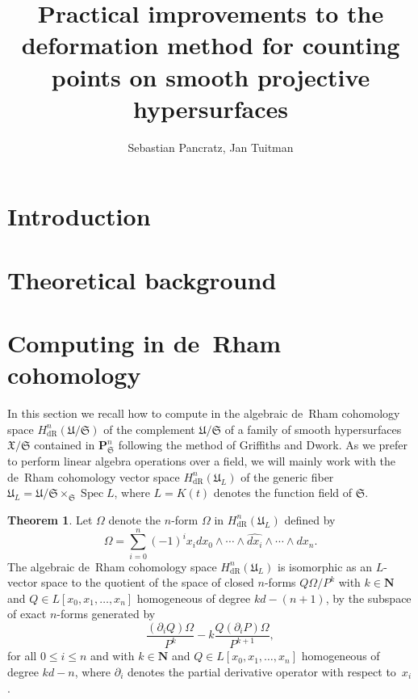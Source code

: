 \documentclass[a4paper,11pt]{article}
\author{Sebastian Pancratz, Jan Tuitman}
\title{Practical improvements to the deformation method for counting points on smooth projective hypersurfaces}
\numberwithin{equation}{section}
\newcommand{\NN}{\mathbf{N}} %
\DeclareMathOperator{\Spec}{Spec}        %
\providecommand{\HdR}{H_{\text{dR}}}    %
\theoremstyle{definition}
\newtheorem{thm}{Theorem}[section]
\begin{document}
\maketitle

\tableofcontents


\section{Introduction}
\label{sec:Introduction}


\section{Theoretical background}
\label{sec:Background}


\section{Computing in de~Rham cohomology}
\label{sec:deRham}

In this section we recall how to compute in the algebraic de~Rham 
cohomology space $\HdR^{n}(\mathfrak{U}/\mathfrak{S})$ of the complement 
$\mathfrak{U}/\mathfrak{S}$ of a family of smooth hypersurfaces 
$\mathfrak{X}/\mathfrak{S}$ contained in $\mathbf{P}^n_{\mathfrak{S}}$ 
following the method of Griffiths and Dwork.  As we prefer to perform linear 
algebra operations over a field, we will mainly work with the de~Rham 
cohomology vector space $\HdR^{n}(\mathfrak{U}_L)$ of the generic fiber 
$\mathfrak{U}_L = \mathfrak{U}/\mathfrak{S} \times_{\mathfrak{S}} \Spec{L}$, 
where $L=K(t)$ denotes the function field of $\mathfrak{S}$. 

\begin{thm}
Let $\Omega$ denote the $n$-form $\Omega$ in $\HdR^{n}(\mathfrak{U}_L)$ 
defined by 
\begin{equation}
\Omega = \sum_{i=0}^n (-1)^i x_i d x_0 \wedge \dotsb \wedge \widehat{d x_i} \wedge \dotsb \wedge d x_n.
\end{equation}
The algebraic de~Rham cohomology space $\HdR^{n}(\mathfrak{U}_L)$ is 
isomorphic as an $L$-vector space to the quotient of the space of closed $n$-forms 
$Q \Omega / P^k$ with $k \in \NN$ and $Q \in L[x_0, x_1, \dotsc, x_n]$ 
homogeneous of degree $k d - (n + 1)$, by the subspace of exact $n$-forms generated by
\begin{equation} \label{eq:deRhamRel}
\frac{(\partial_i Q) \Omega}{P^k} - k \frac{Q (\partial_i P) \Omega}{P^{k+1}},
\end{equation}
for all $0 \leq i \leq n$ and with $k \in \NN$ and $Q \in L[x_0, x_1, \dotsc, x_n]$ 
homogeneous of degree $kd-n$, where $\partial_i$ denotes the partial derivative operator 
with respect to~$x_i$.
\end{thm}
\end{document}
